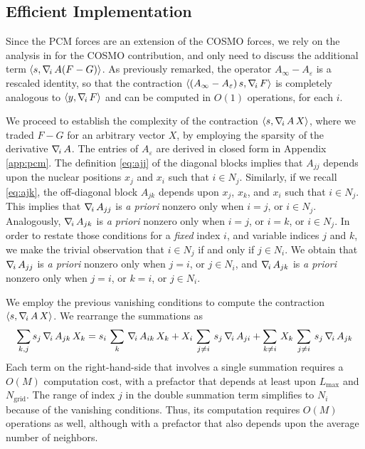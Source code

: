 \subsection{Efficient Implementation}

Since the PCM forces are an extension of the COSMO forces, we rely on the analysis in \cite{Lipparini_JCTC_ddCOSMO} for the COSMO contribution, and only need to discuss the additional term $\langle s , \nabla_{\!i}\,  A ( F - G ) \rangle$. As previously remarked, the operator ${A_\infty} -{A_\varepsilon}$ is a rescaled identity, so that the contraction $\langle ({A_\infty}-{A_\varepsilon})\, s, \nabla_{\!i}\, F \rangle$ is completely analogous to $\langle y , \nabla_{\!i}\, F \rangle$ and can be computed in $O(1)$ operations, for each $i$.
 
 
We proceed to establish the complexity of the contraction $\langle s , \nabla_{\!i}\,  A\, X \rangle$, where we traded $F-G$ for an arbitrary vector $X$, by employing the sparsity of the derivative $\nabla_{\!i}\, A$. The entries of $A_\varepsilon$ are derived in closed form in Appendix \ref{app:pcm}. The definition \eqref{eq:ajj} of the diagonal blocks implies that $A_{jj}$ depends upon the nuclear positions $x_j$ and $x_i$ such that $i \in N_j$. Similarly, if we recall \eqref{eq:ajk}, the off-diagonal block $A_{jk}$ depends upon $x_j$, $x_k$, and $x_i$ such that $i \in N_j$. This implies that $\nabla_{\!i}\, A_{jj}$ is \emph{a priori} nonzero only when $i = j$, or $i \in N_j$. Analogously, $\nabla_{\!i}\, A_{jk}$ is \emph{a priori} nonzero only when $i = j$, or $i = k$, or $i \in N_j$. In order to restate those conditions for a \emph{fixed} index $i$, and variable indices $j$ and $k$, we make the trivial observation that $i \in N_j$ if and only if $j \in N_i$. We obtain that $\nabla_{\!i}\, A_{jj}$ is \emph{a priori} nonzero only when $j = i$, or $j \in N_i$, and $\nabla_{\!i}\, A_{jk}$ is \emph{a priori} nonzero only when $j= i$, or $k = i$, or $j \in N_i$.

We employ the previous vanishing conditions to compute the contraction $\langle s , \nabla_{\!i}\, A\,X \rangle$. We rearrange the summations as
\[
\sum_{k,j} s_j \, \nabla_{\!i}\, A_{jk} \, X_k =  s_i \, \sum_k \, \nabla_{\!i}\, A_{ik} \, X_k + X_i \, \sum_{j \not=i} \, s_j \, \nabla_{\!i}\, A_{ji}  + \sum_{k\not=i} \,X_k \,\sum_{j\not=i} \, s_j \, \nabla_{\!i}\, A_{jk}
\]
Each term on the right-hand-side that involves a single summation requires a $O(M)$ computation cost, with a prefactor that depends at least upon $L_\text{max}$ and $N_\text{grid}$. The range of index $j$ in the double summation term simplifies to $N_i$ because of the vanishing conditions. Thus, its computation requires $O(M)$ operations as well, although with a prefactor that also depends upon the average number of neighbors.

